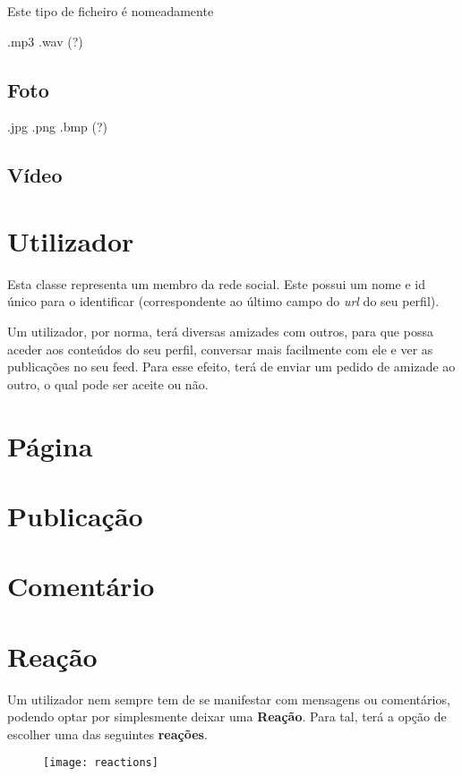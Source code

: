\documentclass{report}
\begin{document}
Este tipo de ficheiro é nomeadamente 

.mp3 .wav (?)

\subsection{Foto}

.jpg .png .bmp (?)

\subsection{Vídeo}

\section{Utilizador}

Esta classe representa um membro da rede social. Este possui um nome e id único para o identificar (correspondente ao último campo do \textit{url} do seu perfil). \par

Um utilizador, por norma, terá diversas amizades com outros, para que possa aceder aos conteúdos do seu perfil, conversar mais facilmente com ele e ver as publicações no seu feed. Para esse efeito, terá de enviar um pedido de amizade ao outro, o qual pode ser aceite ou não.

\section{Página}

\section{Publicação}

\section{Comentário}

\section{Reação}

Um utilizador nem sempre tem de se manifestar com mensagens ou comentários, podendo optar por simplesmente deixar uma \textbf{Reação}. Para tal, terá a opção de escolher uma das seguintes \textbf{reações}.

\begin{figure}[h!]
    \centering
    \texttt{[image: reactions]}
\end{figure}
\end{document}
